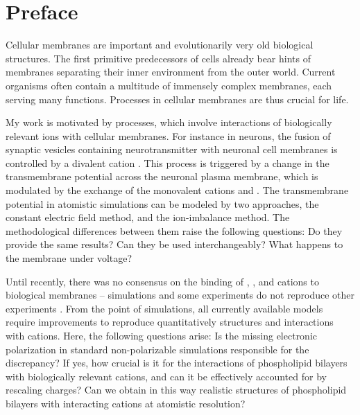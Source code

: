 \chapter*{Preface}

Cellular membranes are important and evolutionarily very old biological structures. 
\citep{MolBiolCell} 
The first primitive predecessors of cells already bear hints of membranes 
separating their inner environment from the outer world. 
Current organisms often contain a multitude of immensely complex membranes, 
each serving many functions. 
Processes in cellular membranes are thus crucial for life. 

My work is motivated by processes,
which involve interactions of biologically relevant ions with cellular membranes. 
For instance in neurons, 
the fusion of synaptic vesicles containing neurotransmitter with neuronal cell membranes 
is controlled by a divalent cation . \citep{Berridge2003, Clapham2007}
This process is triggered by a change in 
the transmembrane potential across the neuronal plasma membrane,
which is modulated by the exchange of the monovalent cations  and . \citep{Knudsen_book2002}
The transmembrane potential in atomistic simulations can be modeled by two approaches, 
the constant electric field method, 
and the ion-imbalance method. 
The methodological differences between them raise the following questions:
Do they provide the same results? 
Can they be used interchangeably?
What happens to the membrane under voltage?

Until recently,
there was no consensus on the binding of 
, , and  cations
to biological membranes -- 
simulations and some experiments   \citep{berkowitz12, vacha09a, harb13}
do not reproduce other experiments \citep{roux90, pabst07, akutsu81}. 
From the point of simulations,
all currently available models 
require improvements to reproduce quantitatively structures and interactions with cations. 
Here, the following questions arise:
Is the missing electronic polarization in standard non-polarizable simulations responsible for the discrepancy?
If yes, how crucial is it for the interactions of phospholipid bilayers with biologically relevant cations,
and can it be effectively accounted for by rescaling charges?
Can we obtain in this way realistic structures of phospholipid bilayers with interacting cations at atomistic resolution?


